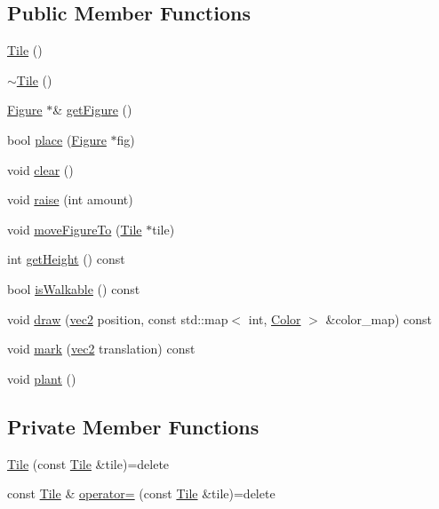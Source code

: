 \subsection*{Public Member Functions}
\begin{DoxyCompactItemize}
\item 
\hyperlink{classTile_aeeb5593bb6b75aae2edfcccbc84ab378}{Tile} ()
\item 
\hyperlink{classTile_a98634abbd93fa13d0578d7103202d03d}{$\sim$\+Tile} ()
\item 
\hyperlink{classFigure}{Figure} $\ast$\& \hyperlink{classTile_a60af31824ef9a5992f9e17b13df76c60}{get\+Figure} ()
\item 
bool \hyperlink{classTile_a1cb171d83f6942aebd2499bc2c678f7f}{place} (\hyperlink{classFigure}{Figure} $\ast$fig)
\item 
void \hyperlink{classTile_a8f482bab4aa537311f8948f225c915a4}{clear} ()
\item 
void \hyperlink{classTile_a2df9b57eb3fdba56aa69d989c18a7989}{raise} (int amount)
\item 
void \hyperlink{classTile_a69a295280f0ab2c2e5325ed3aabaf54e}{move\+Figure\+To} (\hyperlink{classTile}{Tile} $\ast$tile)
\item 
int \hyperlink{classTile_a8ff17f88b15ff106a8df470df9b4bda6}{get\+Height} () const
\item 
bool \hyperlink{classTile_a2f9971efdf7b36249a491ca7ceb2ef57}{is\+Walkable} () const
\item 
void \hyperlink{classTile_ab0e0884c673e59a98e59118fa92127bc}{draw} (\hyperlink{structvec2}{vec2} position, const std\+::map$<$ int, \hyperlink{structColor}{Color} $>$ \&color\+\_\+map) const
\item 
void \hyperlink{classTile_afe81f76a0c23b9050990e0f10eb4128f}{mark} (\hyperlink{structvec2}{vec2} translation) const
\item 
void \hyperlink{classTile_a872043e678348699184b5d55efb4c6d3}{plant} ()
\end{DoxyCompactItemize}
\subsection*{Private Member Functions}
\begin{DoxyCompactItemize}
\item 
\hyperlink{classTile_a0118b16957fc9fc912905c3085afe926}{Tile} (const \hyperlink{classTile}{Tile} \&tile)=delete
\item 
const \hyperlink{classTile}{Tile} \& \hyperlink{classTile_a75da44d88e876130202f7dfddec72121}{operator=} (const \hyperlink{classTile}{Tile} \&tile)=delete
\end{DoxyCompactItemize}
